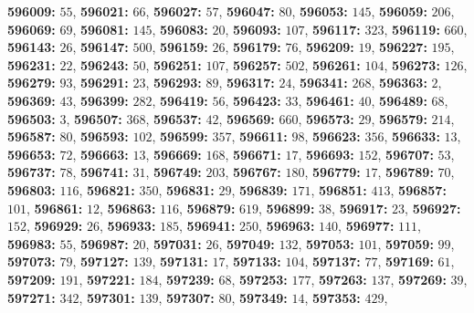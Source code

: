 \textsf{\bfseries 596009:} $55$, \textsf{\bfseries 596021:} $66$, \textsf{\bfseries 596027:} $57$, \textsf{\bfseries 596047:} $80$, \textsf{\bfseries 596053:} $145$, \textsf{\bfseries 596059:} $206$, \textsf{\bfseries 596069:} $69$, \textsf{\bfseries 596081:} $145$, \textsf{\bfseries 596083:} $20$, \textsf{\bfseries 596093:} $107$, \textsf{\bfseries 596117:} $323$, \textsf{\bfseries 596119:} $660$, \textsf{\bfseries 596143:} $26$, \textsf{\bfseries 596147:} $500$, \textsf{\bfseries 596159:} $26$, \textsf{\bfseries 596179:} $76$, \textsf{\bfseries 596209:} $19$, \textsf{\bfseries 596227:} $195$, \textsf{\bfseries 596231:} $22$, \textsf{\bfseries 596243:} $50$, \textsf{\bfseries 596251:} $107$, \textsf{\bfseries 596257:} $502$, \textsf{\bfseries 596261:} $104$, \textsf{\bfseries 596273:} $126$, \textsf{\bfseries 596279:} $93$, \textsf{\bfseries 596291:} $23$, \textsf{\bfseries 596293:} $89$, \textsf{\bfseries 596317:} $24$, \textsf{\bfseries 596341:} $268$, \textsf{\bfseries 596363:} $2$, \textsf{\bfseries 596369:} $43$, \textsf{\bfseries 596399:} $282$, \textsf{\bfseries 596419:} $56$, \textsf{\bfseries 596423:} $33$, \textsf{\bfseries 596461:} $40$, \textsf{\bfseries 596489:} $68$, \textsf{\bfseries 596503:} $3$, \textsf{\bfseries 596507:} $368$, \textsf{\bfseries 596537:} $42$, \textsf{\bfseries 596569:} $660$, \textsf{\bfseries 596573:} $29$, \textsf{\bfseries 596579:} $214$, \textsf{\bfseries 596587:} $80$, \textsf{\bfseries 596593:} $102$, \textsf{\bfseries 596599:} $357$, \textsf{\bfseries 596611:} $98$, \textsf{\bfseries 596623:} $356$, \textsf{\bfseries 596633:} $13$, \textsf{\bfseries 596653:} $72$, \textsf{\bfseries 596663:} $13$, \textsf{\bfseries 596669:} $168$, \textsf{\bfseries 596671:} $17$, \textsf{\bfseries 596693:} $152$, \textsf{\bfseries 596707:} $53$, \textsf{\bfseries 596737:} $78$, \textsf{\bfseries 596741:} $31$, \textsf{\bfseries 596749:} $203$, \textsf{\bfseries 596767:} $180$, \textsf{\bfseries 596779:} $17$, \textsf{\bfseries 596789:} $70$, \textsf{\bfseries 596803:} $116$, \textsf{\bfseries 596821:} $350$, \textsf{\bfseries 596831:} $29$, \textsf{\bfseries 596839:} $171$, \textsf{\bfseries 596851:} $413$, \textsf{\bfseries 596857:} $101$, \textsf{\bfseries 596861:} $12$, \textsf{\bfseries 596863:} $116$, \textsf{\bfseries 596879:} $619$, \textsf{\bfseries 596899:} $38$, \textsf{\bfseries 596917:} $23$, \textsf{\bfseries 596927:} $152$, \textsf{\bfseries 596929:} $26$, \textsf{\bfseries 596933:} $185$, \textsf{\bfseries 596941:} $250$, \textsf{\bfseries 596963:} $140$, \textsf{\bfseries 596977:} $111$, \textsf{\bfseries 596983:} $55$, \textsf{\bfseries 596987:} $20$, \textsf{\bfseries 597031:} $26$, \textsf{\bfseries 597049:} $132$, \textsf{\bfseries 597053:} $101$, \textsf{\bfseries 597059:} $99$, \textsf{\bfseries 597073:} $79$, \textsf{\bfseries 597127:} $139$, \textsf{\bfseries 597131:} $17$, \textsf{\bfseries 597133:} $104$, \textsf{\bfseries 597137:} $77$, \textsf{\bfseries 597169:} $61$, \textsf{\bfseries 597209:} $191$, \textsf{\bfseries 597221:} $184$, \textsf{\bfseries 597239:} $68$, \textsf{\bfseries 597253:} $177$, \textsf{\bfseries 597263:} $137$, \textsf{\bfseries 597269:} $39$, \textsf{\bfseries 597271:} $342$, \textsf{\bfseries 597301:} $139$, \textsf{\bfseries 597307:} $80$, \textsf{\bfseries 597349:} $14$, \textsf{\bfseries 597353:} $429$, 
